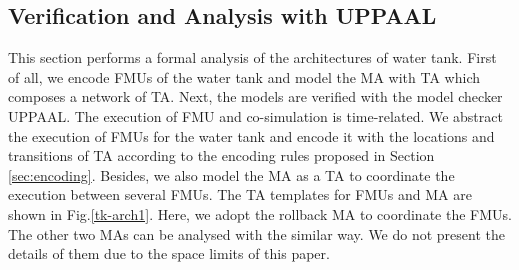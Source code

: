 \subsection{Verification and Analysis with UPPAAL}
\label{sec:mauppaal}
This section performs a formal analysis of the architectures of water tank. First of all, we encode FMUs of the water tank and model the MA with TA which composes a network of TA. Next, the models are verified with the model checker UPPAAL. The execution of FMU and co-simulation is time-related. We abstract the execution of FMUs for the water tank and encode it with the locations and transitions of TA according to the encoding rules proposed in Section \ref{sec:encoding}. Besides, we also model the MA as a TA to coordinate the execution between several FMUs. The TA templates for FMUs and MA are shown in Fig.\ref{tk-arch1}. Here, we adopt the rollback MA to coordinate the FMUs. The other two MAs can be analysed with the similar way. We do not present the details of them due to the space limits of this paper.

\begin{figure}[htbp]
\end{figure}


